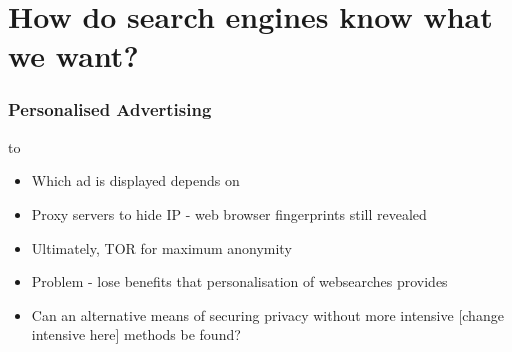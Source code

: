\documentclass{beamer}
\begin{document}
\section{How do search engines know what we want?}

\begin{frame}
\frametitle{Personalised Advertising}
\begin{minipage}{0.4\textwidth}
	\vbox to 
\end{minipage}\hfill
\begin{minipage}{0.6\textwidth}
	\begin{itemize}
		\item Which ad  is displayed depends on 
		\item Proxy servers to hide IP - web browser fingerprints still revealed
		\item Ultimately, TOR for maximum anonymity
		\item Problem - lose benefits that personalisation of websearches provides
		\item Can an alternative means of securing privacy without more intensive [change intensive here] methods be found?
	\end{itemize}
\end{minipage}

\end{frame}

\end{document}
